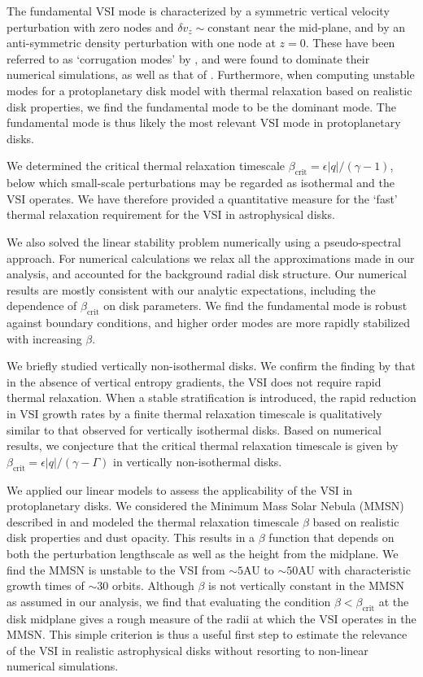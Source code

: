 The fundamental VSI mode is characterized by a symmetric vertical
velocity perturbation with zero nodes and $\delta
v_z\sim\mathrm{constant}$ near the mid-plane, and by an anti-symmetric
density perturbation with one node at $z=0$.  These have been referred
to as `corrugation modes' by \cite{nelson13}, and were found to
dominate their numerical simulations, as well as that of
\cite{stoll14}. Furthermore, when computing unstable modes for a
protoplanetary disk model with thermal relaxation based on realistic
disk properties, we find the fundamental mode to be the dominant
mode. The fundamental mode is
thus likely the most relevant VSI mode in protoplanetary disks.  

We determined the critical thermal relaxation timescale 
$\beta_\mathrm{crit}=\epsilon|q|/(\gamma-1)$, below which small-scale
perturbations may be regarded as isothermal and the VSI 
operates. We have therefore provided a quantitative measure for the `fast'
thermal relaxation requirement for the VSI in astrophysical disks. 

We also solved the linear stability problem numerically using a
pseudo-spectral approach. For numerical calculations we relax all the
approximations made in our analysis, and accounted for
the background radial disk structure.  Our
numerical results are mostly consistent with our analytic 
expectations, including the dependence of $\beta_\mathrm{crit}$ on
disk parameters.  We find the fundamental mode is robust against
boundary conditions, and higher order modes are more rapidly
stabilized with increasing $\beta$. 

We briefly studied vertically non-isothermal disks. We confirm the finding by \cite{nelson13} that in the absence
of vertical entropy gradients, the VSI does not require rapid thermal
relaxation.  When a stable stratification is introduced, the
rapid reduction in VSI growth rates by a finite thermal relaxation
timescale is qualitatively similar to that observed for vertically
isothermal disks. Based on numerical results, we conjecture that the
critical thermal relaxation timescale is given by 
$\beta_\mathrm{crit}=\epsilon|q|/(\gamma-\Gamma)$ in vertically 
non-isothermal disks.  


We applied our linear models to assess the applicability of the VSI in
protoplanetary disks. We considered the Minimum Mass Solar Nebula 
(MMSN) described in \cite{chiang10} and   
modeled the thermal relaxation timescale $\beta$ based on realistic
disk properties and dust opacity. This results in a $\beta$ function that
depends on both the perturbation lengthscale as well as the height 
from the midplane. We find the MMSN is unstable to the VSI 
from $\sim 5$AU to $\sim50$AU with characteristic growth times of
$\sim 30$ orbits. Although $\beta$ is not vertically constant in the
MMSN as assumed in our analysis, we find that evaluating the condition
$\beta <\beta_\mathrm{crit}$ at the disk midplane gives a rough measure of the
radii at which the VSI operates in the MMSN. This simple criterion is
thus a useful first step to estimate the relevance of the VSI in
realistic astrophysical disks without resorting to non-linear
numerical simulations.  

